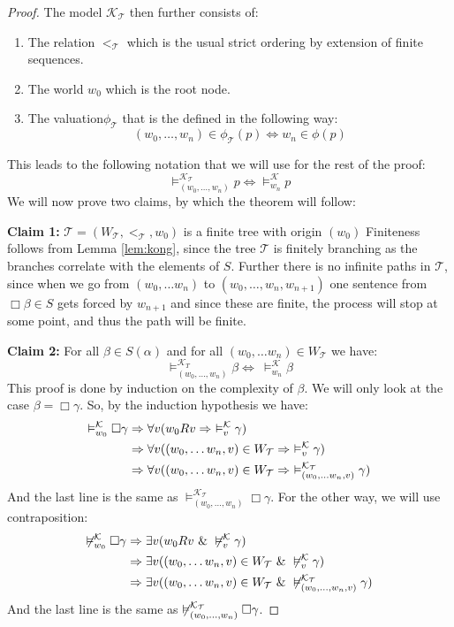 \documentclass[../main.tex]{subfiles}
\begin{document}
\begin{proof}
	The model $\mathcal{K}_{\mathcal{T}}$ then further consists of:
	\begin{enumerate}
		\item The relation $<_{\mathcal{T}}$ which is the usual strict
	ordering by extension of finite sequences. 
		\item	The world $w_0$ which is the root node.
		\item The valuation$\phi_{\mathcal{T}}$ that is the defined in
		the following way:
		\[(w_0,\ldots,w_n)\in \phi_{\mathcal{T}}(p)\Leftrightarrow w_n\in\phi(p)\]
	\end{enumerate}
	This leads to the following notation that we will use for the rest
	of the proof:
	\[\vDash_{(w_0,\ldots,w_n)}^{\mathcal{K}_{\mathcal{T}}}p\Leftrightarrow\vDash_{w_n}^\mathcal{K}
	p\]
	We will now prove two claims, by which the theorem will follow:

	\textbf{Claim 1:} $\mathcal{T}=(W_{\mathcal{T}},<_{\mathcal{T}},w_0)$ is a finite tree with origin $(w_0)$
	Finiteness follows from Lemma \ref{lem:kong}, since the tree $\mathcal{T}$
	is finitely branching as the branches correlate with the elements
	of $S$. Further there is no infinite paths in $\mathcal{T}$, since when
	we go from $(w_0,\ldots w_n)$ to $(w_0,\ldots, w_n,w_{n+1})$ one
	sentence from $\Box\beta\in S$ gets forced by $w_{n+1 }$ and since
	these are finite, the process will stop at some point, and thus the
	path will be finite.

	\textbf{Claim 2:} For all $\beta\in S(\alpha)$ and for all $(w_0,\ldots
	w_n)\in W_{\mathcal{T}}$ we have:
	$$\vDash^{\mathcal{K}_T}_{(w_0,\ldots,w_n)}\beta\Leftrightarrow\ \vDash_{w_n}^\mathcal{K}\beta$$
	This proof is done by induction on the complexity of $\beta$. We will
	only look at the case $\beta=\Box\gamma$. So, by the induction
	hypothesis we have:
	\begin{align*}
		\vDash^{\mathcal{K}}_{w_0}\Box\gamma&\Rightarrow\forall v(w_0Rv\Rightarrow\ 
		\vDash^{\mathcal{K}}_v\gamma)\\
				      &\Rightarrow\forall v((w_0,\ldots
				      w_n,v)\in W_\T\Rightarrow\
				      \vDash^{\mathcal{K}}_v\gamma)\\
				      &\Rightarrow\forall v((w_0,\ldots
				      w_n,v)\in W_{\mathcal{T}}\Rightarrow\
				      \vDash_{(w_0,\ldots
				      w_n,v)}^{\mathcal{K}_\mathcal{T}}\gamma)
	\end{align*}
	And the last line is the same as $\vDash^{\mathcal{K}_\mathcal{T}}_{(w_0,\ldots,w_n)}\Box\gamma$.
	For the other way, we will use contraposition:
	\begin{align*}
		\not\vDash^{\mathcal{K}}_{w_0}\Box\gamma&\Rightarrow \exists v(w_0Rv\ \&\
		\not\vDash^{\mathcal{K}}_v\gamma)\\
					  &\Rightarrow\exists v((w_0,\ldots
					  w_n,v)\in W_{\mathcal{T}}\ \&\
					  \not\vDash^{\mathcal{K}}_v\gamma)\\
					  &\Rightarrow\exists v((w_0,\ldots
					  w_n,v)\in W_{\mathcal{T}}\ \&\
					  \not\vDash_{(w_0,\ldots,w_n,v)}^{\mathcal{K}_\mathcal{T}}\gamma)
	\end{align*}
	And the last line is the same as
	$\not\vDash^{\mathcal{K}_{\mathcal{T}}}_{(w_0,\ldots,w_n)}\Box\gamma$. 


\end{proof}
\end{document}
